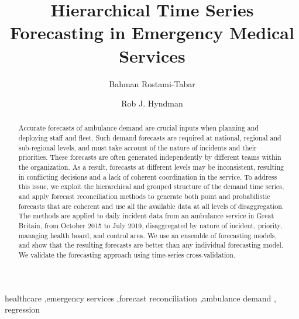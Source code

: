 \documentclass[
  authoryear,
  preprint,
  3p]{elsarticle}
\begin{document}
\begin{frontmatter}
\title{Hierarchical Time Series Forecasting in Emergency Medical
Services}
\author[1]{Bahman Rostami-Tabar%
%
}
\author[2]{Rob J. Hyndman%
%
}




        
\begin{abstract}
Accurate forecasts of ambulance demand are crucial inputs when planning
and deploying staff and fleet. Such demand forecasts are required at
national, regional and sub-regional levels, and must take account of the
nature of incidents and their priorities. These forecasts are often
generated independently by different teams within the organization. As a
result, forecasts at different levels may be inconsistent, resulting in
conflicting decisions and a lack of coherent coordination in the
service. To address this issue, we exploit the hierarchical and grouped
structure of the demand time series, and apply forecast reconciliation
methods to generate both point and probabilistic forecasts that are
coherent and use all the available data at all levels of disaggregation.
The methods are applied to daily incident data from an ambulance service
in Great Britain, from October 2015 to July 2019, disaggregated by
nature of incident, priority, managing health board, and control area.
We use an ensemble of forecasting models, and show that the resulting
forecasts are better than any individual forecasting model. We validate
the forecasting approach using time-series cross-validation.
\end{abstract}





\begin{keyword}
    healthcare \sep emergency services \sep forecast
reconciliation \sep ambulance demand \sep 
    regression
\end{keyword}
\end{frontmatter}
    \ifdefined\Shaded\renewenvironment{Shaded}{\begin{tcolorbox}[interior hidden, frame hidden, boxrule=0pt, borderline west={3pt}{0pt}{shadecolor}, enhanced, sharp corners, breakable]}{\end{tcolorbox}}\fi
\end{document}
